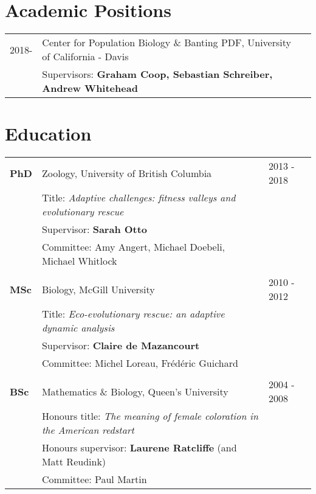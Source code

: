 \documentclass[12pt]{article}
\begin{document}

\section*{Academic Positions}

\begin{tabular}{lll}
2018- & Center for Population Biology \& Banting PDF, University of California - Davis\\
& Supervisors: \textbf{Graham Coop, Sebastian Schreiber, Andrew Whitehead}
\end{tabular}

\section*{Education}

\begin{tabular}{lll}
\textbf{PhD} & Zoology, University of British Columbia & 2013 - 2018\\
& Title: \textit{Adaptive challenges: fitness valleys and evolutionary rescue}\\
& Supervisor: \textbf{Sarah Otto}\\
& Committee: Amy Angert, Michael Doebeli, Michael Whitlock\\
\\
\textbf{MSc} & Biology, McGill University & 2010 - 2012 \\
& Title: \textit{Eco-evolutionary rescue: an adaptive dynamic analysis}  \\
& Supervisor: \textbf{Claire de Mazancourt}\\
& Committee: Michel Loreau, Fr\'{e}d\'{e}ric Guichard\\
\\
\textbf{BSc} &  Mathematics \& Biology, Queen's University & 2004 - 2008\\ %
& Honours title: \textit{The meaning of female coloration in the American redstart}  \\
& Honours supervisor: \textbf{Laurene Ratcliffe} (and Matt Reudink)\\
& Committee: Paul Martin\\
\end{tabular}
\end{document}
